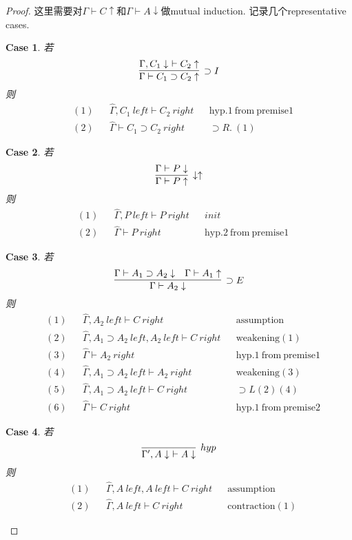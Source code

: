 \documentclass{article}
\theoremstyle{plain}
\newtheorem{case}{Case}
\theoremstyle{nonumberplain}
\newtheorem{proof}{Proof}
\begin{document}
\begin{proof}
\rm 这里需要对$\Gamma \vdash C \uparrow$和$\Gamma \vdash A \downarrow$做mutual induction. 记录几个representative cases.
\begin{case} 若
$$
\infer[\supset I]{\Gamma \vdash C_1 \supset C_2 \uparrow}{\Gamma, C_1 \downarrow\,\, \vdash C_2 \uparrow}
$$
则
$$
\begin{aligned}
&(1) && \widehat{\Gamma}, C_1~left \vdash C_2~right && \text{hyp.1}~\text{from}~\text{premise}1 \\
&(2) &&\widehat{\Gamma} \vdash C_1 \supset C_2 ~right && \supset R.~(1)
\end{aligned}
$$
\end{case}
\begin{case}若
$$
\infer[\downarrow\uparrow]{\Gamma \vdash P \uparrow}{\Gamma \vdash P \downarrow}
$$
则
$$
\begin{aligned}
&(1) && \widehat{\Gamma}, P~left \vdash P~right && init \\
&(2) && \widehat{\Gamma} \vdash P~right && \text{hyp}.2~\text{from}~\text{premise}1
\end{aligned}
$$
\end{case}
\begin{case}若
$$
\infer[\supset E]{\Gamma \vdash A_2 \downarrow}{\Gamma \vdash A_1 \supset A_2 \downarrow & \Gamma \vdash A_1 \uparrow}
$$
则
$$
\begin{aligned}
&(1) &&\widehat{\Gamma}, A_2~left \vdash C~right && \text{assumption} \\
&(2) &&\widehat{\Gamma}, A_1 \supset A_2~left, A_2~left \vdash C~right && \text{weakening} (1) \\ 
&(3) &&\widehat{\Gamma} \vdash A_2~right && \text{hyp}.1~\text{from}~\text{premise}1 \\
&(4) &&\widehat{\Gamma}, A_1 \supset A_2~left \vdash A_2~right && \text{weakening} (3) \\
&(5) &&\widehat{\Gamma}, A_1 \supset A_2~left \vdash C~right && \supset L (2) (4) \\
&(6) &&\widehat{\Gamma} \vdash C~right && \text{hyp}.1~\text{from}~\text{premise}2
\end{aligned}
$$
\end{case}
\begin{case}若
$$
\infer[hyp]{\Gamma', A\downarrow\,\, \vdash A \downarrow}{}
$$
则
$$
\begin{aligned}
&(1) && \widehat{\Gamma}, A~left, A~left \vdash C~right && \text{assumption} \\
&(2) && \widehat{\Gamma}, A~left \vdash C~right && \text{contraction}(1)
\end{aligned}
$$
\end{case}
\end{proof}
\end{document}
